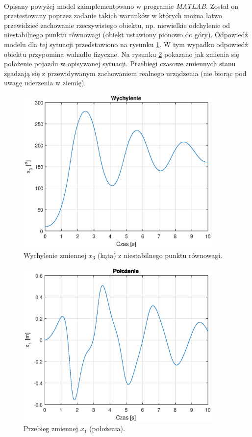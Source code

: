 \paragraph*{}
Opisany powyżej model zaimplementowano w programie \textit{MATLAB}. Został on przetestowany poprzez zadanie takich warunków w których można łatwo przewidzieć zachowanie rzeczywistego obiektu, np. niewielkie odchylenie od niestabilnego punktu równowagi (obiekt ustawiony pionowo do góry). Odpowiedź modelu dla tej sytuacji przedstawiono na rysunku \ref{fig:wychylenie_test}. W tym wypadku odpowiedź obiektu przypomina wahadło fizyczne. Na rysunku \ref{fig:polozenie_test} pokazano jak zmienia się położenie pojazdu w opisywanej sytuacji. Przebiegi czasowe zmiennych stanu zgadzają się z przewidywanym zachowaniem realnego urządzenia (nie biorąc pod uwagę uderzenia w ziemię).

\begin{figure}[h]
	\centering
	\includegraphics[width=4in]{Figures/wychylenie_test.eps}
	\caption{Wychylenie zmiennej \(x_3\) (kąta) z niestabilnego punktu równowagi.}
	\label{fig:wychylenie_test}
\end{figure}

\begin{figure}[h]
	\centering
	\includegraphics[width=4in]{Figures/polozenie_test.eps}
	\caption{Przebieg zmiennej \(x_1\) (położenia).}
	\label{fig:polozenie_test}
\end{figure}